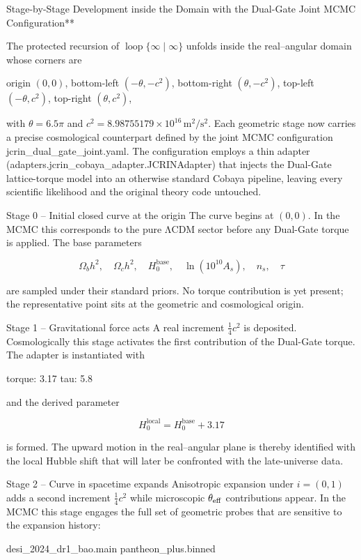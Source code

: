 Stage-by-Stage Development inside the Domain  
with the Dual-Gate Joint MCMC Configuration**

The protected recursion of \(\operatorname{loop}\{\infty\mid\infty\}\) unfolds inside the real–angular domain whose corners are

origin \((0,0)\),
bottom-left \((-\theta,-c^2)\),
bottom-right \((\theta,-c^2)\),
top-left \((-\theta,c^2)\),
top-right \((\theta,c^2)\),

with \(\theta=6.5\pi\) and \(c^2=8.98755179\times10^{16}\,\mathrm{m}^2/\mathrm{s}^2\).  
Each geometric stage now carries a precise cosmological counterpart defined by the joint MCMC configuration jcrin_dual_gate_joint.yaml. The configuration employs a thin adapter (adapters.jcrin_cobaya_adapter.JCRINAdapter) that injects the Dual-Gate lattice-torque model into an otherwise standard Cobaya pipeline, leaving every scientific likelihood and the original theory code untouched.

Stage 0 – Initial closed curve at the origin
The curve begins at \((0,0)\).  
In the MCMC this corresponds to the pure ΛCDM sector before any Dual-Gate torque is applied. The base parameters

\[
\Omega_b h^2,\quad\Omega_c h^2,\quad H_0^\mathrm{base},\quad\ln(10^{10}A_s),\quad n_s,\quad\tau
\]

are sampled under their standard priors. No torque contribution is yet present; the representative point sits at the geometric and cosmological origin.

Stage 1 – Gravitational force acts
A real increment \(\frac14 c^2\) is deposited.  
Cosmologically this stage activates the first contribution of the Dual-Gate torque. The adapter is instantiated with

torque: 3.17
tau: 5.8

and the derived parameter

\[
H_0^\mathrm{local}=H_0^\mathrm{base}+3.17
\]

is formed. The upward motion in the real–angular plane is thereby identified with the local Hubble shift that will later be confronted with the late-universe data.

Stage 2 – Curve in spacetime expands
Anisotropic expansion under \(i=(0,1)\) adds a second increment \(\frac14 c^2\) while microscopic \(\theta_{\rm eff}\) contributions appear.  
In the MCMC this stage engages the full set of geometric probes that are sensitive to the expansion history:

desi_2024_dr1_bao.main
pantheon_plus.binned

